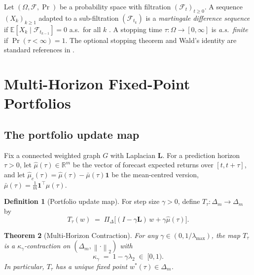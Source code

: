 \documentclass[twocolumn,11pt,a4paper]{article}
\theoremstyle{plain}
\newtheorem{theorem}{Theorem}[section]
\theoremstyle{definition}
\newtheorem{definition}[theorem]{Definition}
\theoremstyle{remark}
\newcommand{\R}{\mathbb{R}}
\newcommand{\E}{\mathbb{E}}
\newcommand{\F}{\mathcal{F}}
\newcommand{\Lop}{\mathbf{L}}        %
\newcommand{\proj}{\Pi_{\Delta}}     %
\newcommand{\wstar}{w^{*}}
\newcommand{\Deltam}{\Delta_m}
\newcommand{\lamtwo}{\lambda_2}
\newcommand{\lammax}{\lambda_{\max}}
\newcommand{\norm}[1]{\left\|#1\right\|}
\newcommand{\one}{\mathbf{1}}
\begin{document}
Let $(\Omega,\F,\Pr)$ be a probability space with filtration
$(\F_t)_{t\ge 0}$.  A sequence $(X_k)_{k\ge 1}$ adapted to a
sub-filtration $(\F_{t_k})$ is a \emph{martingale difference sequence}
if $\E[X_k\mid\F_{t_{k-1}}]=0$ a.s.~for all $k$ \cite{Doob1953,Williams1991}.
A stopping time $\tau:\Omega\to[0,\infty]$ is \emph{a.s.~finite} if
$\Pr(\tau<\infty)=1$.  The optional stopping theorem and Wald's identity
are standard references in \cite{Doob1953,Shiryaev1978}.

\section{Multi-Horizon Fixed-Point Portfolios}
\label{sec:multihorizon}

\subsection{The portfolio update map}
\label{sec:updatemap}

Fix a connected weighted graph $G$ with Laplacian $\Lop$.  For a
prediction horizon $\tau>0$, let $\hat\mu(\tau)\in\R^m$ be the vector
of forecast expected returns over $[t,t+\tau]$, and let
$\hat\mu_c(\tau)=\hat\mu(\tau)-\bar\mu(\tau)\one$ be the
mean-centred version, $\bar\mu(\tau)=\frac{1}{m}\one^{\top}\hat\mu(\tau)$.

\begin{definition}[Portfolio update map]
  For step size $\gamma>0$, define $T_\tau:\Deltam\to\Deltam$ by
  \begin{equation}
    T_\tau(w) \;=\; \proj\!\bigl[(I-\gamma\Lop)\,w + \gamma\hat\mu(\tau)\bigr].
    \label{eq:Ttau}
  \end{equation}
\end{definition}

\begin{theorem}[Multi-Horizon Contraction]
  \label{thm:contraction}
  For any $\gamma\in(0,1/\lammax)$, the map $T_\tau$ is a
  $\kappa_\gamma$-contraction on $(\Deltam,\norm{\cdot}_2)$ with
  \begin{equation}
    \kappa_\gamma \;=\; 1 - \gamma\lamtwo \;\in\; [0,1).
    \label{eq:kappa}
  \end{equation}
  In particular, $T_\tau$ has a unique fixed point
  $\wstar(\tau)\in\Deltam$.
\end{theorem}
\end{document}
